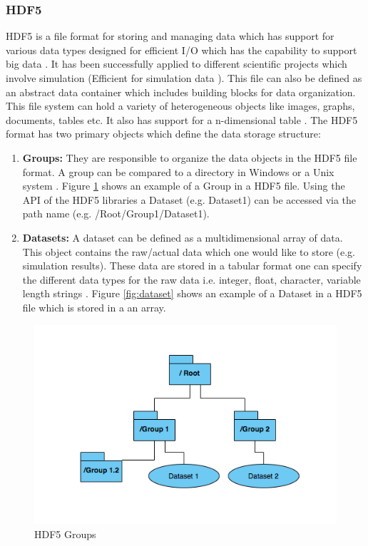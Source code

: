 \subsubsection{HDF5}
HDF5 is a file format for storing and managing data which has support for various data types designed for
efficient I/O which has the capability to support big data \cite{HDF5}. It has been successfully applied to different scientific projects which
involve simulation (Efficient
for simulation data \cite[p.~11]{Savic2007}). This file can also be defined as an abstract data container which includes building blocks for data organization. 
This file system can hold a variety of heterogeneous objects like images, graphs, documents, tables etc. It also has support for a n-dimensional table  \cite[p.~2]{HDF5}. 
The HDF5 format has two primary objects which define the data storage structure:
\begin{enumerate}
    \item \textbf{Groups:}  They are responsible to organize the data objects in the HDF5 file format. A group can be compared to a directory 
    in Windows or a Unix system \cite{HDF5}. Figure \ref{fig:HDF5} shows an example of a Group in a HDF5 file. Using the API of the HDF5 libraries a Dataset 
    (e.g. Dataset1) can be accessed via the path name (e.g. /Root/Group1/Dataset1).
    \item \textbf{Datasets:} A dataset can be defined as a multidimensional array of data. This object contains the raw/actual data which one would like to store (e.g. simulation results).
    These data are stored in a tabular format 
    one can specify the different data types for the raw data i.e. integer, float, character, variable length strings \cite{HDF5}. Figure \ref{fig:dataset} shows
    an example of a Dataset in a HDF5 file which is stored in a an array.
\end{enumerate}

\begin{figure}[H]
    \centering \includegraphics[scale=0.6]{grafiken/groupsHDF5.png}
    \caption{HDF5 Groups \cite{HDF5}}
    \label{fig:HDF5}
\end{figure}

